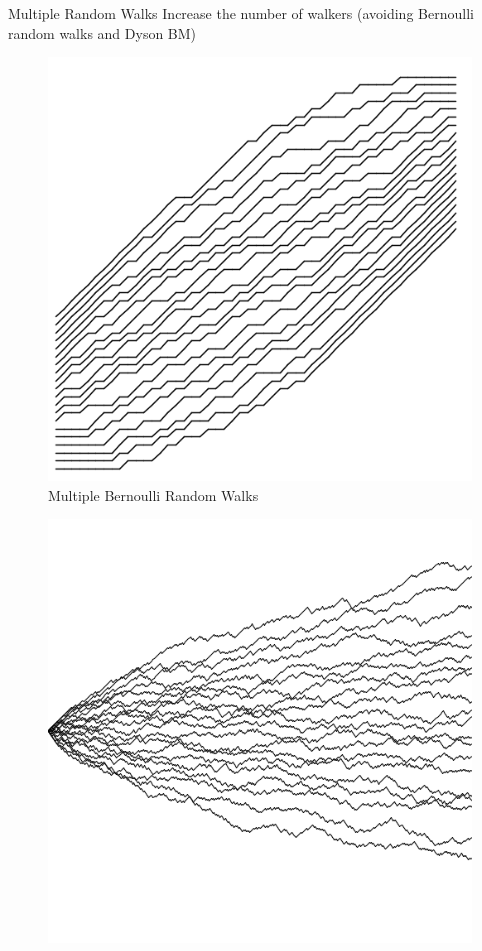 \documentclass[9pt,t]{beamer}
\begin{document}
\begin{frame}{Multiple Random Walks}
Increase the number of walkers (avoiding Bernoulli random walks and Dyson BM)
\begin{figure}
	\includegraphics[height=0.25\textheight]{graphics/MultipleBernoulli.png}
	\caption{Multiple Bernoulli Random Walks}
\end{figure}
\begin{figure}
\includegraphics[height=0.25\textheight]{graphics/DysonBrownian.png}
\end{figure}
\end{frame}
\end{document}
